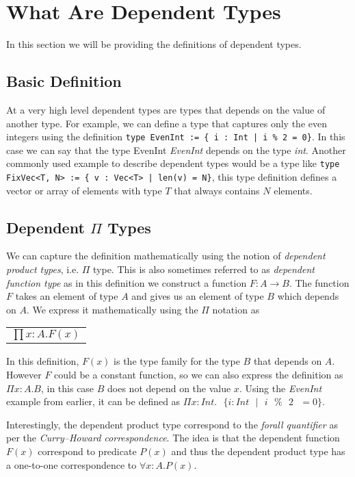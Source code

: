 \documentclass[a4paper,12pt]{report}
\begin{document}
\section{What Are Dependent Types}
In this section we will be providing the definitions of dependent types.

\subsection{Basic Definition}
At a very high level dependent types are types that depends on the value of 
another type. For example, we can define a type that captures only the even 
integers using the definition 
\verb+type EvenInt := { i : Int | i % 2 = 0}+. In this case we 
can say that the type EvenInt \textit{EvenInt} depends on the type \textit{int}.
Another commonly used example to describe dependent types would be a type like 
\verb+type FixVec<T, N> := { v : Vec<T> | len(v) = N}+, this type definition defines 
a vector or array of elements with type $T$ that always contains $N$ elements.

\subsection{Dependent $\Pi$ Types}
We can capture the definition mathematically using the notion of \textit{dependent 
product types}, i.e. $\Pi$ type. This is also sometimes referred to as 
\textit{dependent function type} as in this definition we construct a function 
$F: A \rightarrow B$. The function $F$ takes an element of type $A$ and 
gives us an element of type $B$ which depends on $A$. We express it 
mathematically using the $\Pi$ notation as
\begin{center}
 \begin{tabular}{l}
   $\prod x: A.  F(x)$
 \end{tabular} 
\end{center}

In this definition, $F(x)$ is the type family for the type $B$ that depends on $A$.
However $F$ could be a constant function, so we can also express the definition 
as $\Pi x:A.B$, in this case $B$ does not depend 
on the value $x$. Using the \textit{EvenInt} example from earlier, 
it can be defined as 
$\Pi x:Int.\text{ }\{ i:Int\text{ }|\text{ }i\text{ }\%\text{ }2\text{ }= 0\}$.

\par
Interestingly, the dependent product type correspond to the 
\textit{forall quantifier} as per 
the \textit{Curry–Howard correspondence}. The idea is that the dependent 
function $F(x)$ correspond to predicate $P(x)$ and thus the dependent product 
type has a one-to-one correspondence to $\forall x: A. P(x)$.
\end{document}
